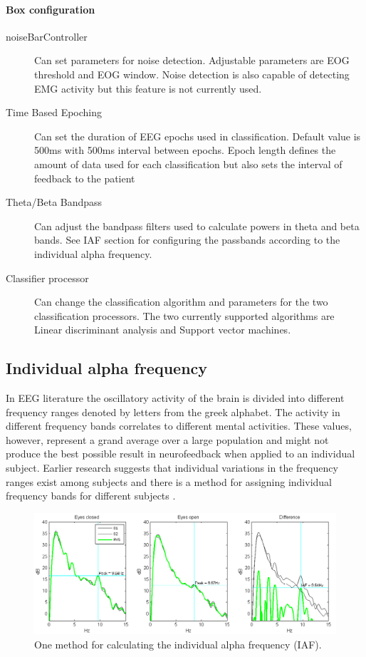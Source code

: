 \paragraph{Box configuration}

\begin{description}
\item[noiseBarController] Can set parameters for noise detection. Adjustable parameters are EOG threshold and EOG window. Noise detection is also capable of detecting EMG activity but this feature is not currently used.
\item[Time Based Epoching] Can set the duration of EEG  epochs used in classification. Default value is 500ms with 500ms interval between epochs. Epoch length defines the amount of data used for each classification but also sets the interval of feedback to the patient
\item[Theta/Beta Bandpass] Can adjust the bandpass filters used to calculate powers in theta and beta bands. See IAF section for configuring the passbands according to the individual alpha frequency.
\item[Classifier processor] Can change the classification algorithm and parameters for the two classification processors. The two currently supported algorithms are Linear discriminant analysis and Support vector machines. 
\end{description}

\subsection{Individual alpha frequency}
In EEG literature the oscillatory activity of the brain is divided into different frequency ranges denoted by letters from the greek alphabet. The activity in different frequency bands correlates to different mental activities. These values, however, represent a grand average over a large population and might not produce the best possible result in neurofeedback when applied to an individual subject. Earlier research suggests that individual variations in the frequency ranges exist among subjects and there is a method for assigning individual frequency bands for different subjects \cite{klimesch1999eeg}. 

\begin{figure}[ht]
	\centering
	\includegraphics[scale=0.4]{IAF.png}
	\caption{One method for calculating the individual alpha frequency (IAF).}
\end{figure}

